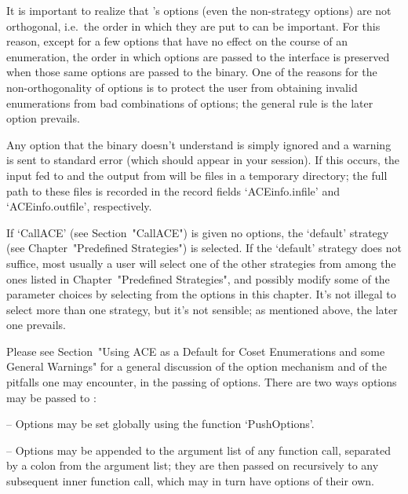 It is important to realize that {\ACE}'s options (even the non-strategy 
options) are not orthogonal, i.e.\ the order in which they are put to
{\ACE} can be important.  For this reason,  except for a  few options
that have no effect on the course of an  enumeration,  the  order  in
which  options  are passed to the {\ACE} interface is preserved  when 
those same options are passed to the {\ACE} binary. One of the reasons
for  the  non-orthogonality  of  options  is to protect the user from
obtaining invalid enumerations from bad combinations of options;  the
general rule is the later option prevails.

Any  option  that the {\ACE} binary doesn't  understand  is    simply
ignored  and a warning is sent to standard error (which should appear
in your {\GAP} session). If this occurs, the input fed to  {\ACE} and
the output from {\ACE} will be files  in a  temporary directory;  the
full   path   to  these   files   is  recorded  in  the record fields
`ACEinfo.infile' and `ACEinfo.outfile', respectively.

If `CallACE' (see Section~"CallACE") is given no options, the `default'
strategy (see Chapter~"Predefined Strategies")  is  selected.  If  the
`default' strategy does not suffice, most usually a user will   select
one   of   the   other   strategies   from   among  the ones listed in 
Chapter~"Predefined Strategies", and   possibly   modify   some of the 
parameter choices by selecting from the options in this chapter.  It's
not illegal to select more than one strategy,  but  it's not sensible;
as mentioned above, the later one prevails.

Please  see Section~"Using ACE as a Default for Coset Enumerations and 
some General Warnings" for a general discussion of the option mechanism
and of the pitfalls one  may encounter, in the passing of options.
There are two ways options may be passed to {\ACE}:

\beginlist

\item{--} Options may be set globally using the function `PushOptions'.

\item{--} Options may be appended to the argument list of any function
call,  separated by a  colon from  the argument  list;  they  are then
passed on recursively to any subsequent inner function call, which may
in turn have options of their own.


